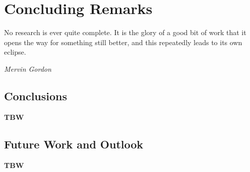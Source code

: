 \chapter{Concluding Remarks}
	\vspace{-2 cm}
	\epigraph{No research is ever quite complete. It is the glory of a good bit of work that it opens the way for something still better, and this repeatedly leads to its own eclipse.}{\textit{Mervin Gordon}}

\section{Conclusions}

\textbf{TBW}
        
\section{Future Work and Outlook}

\textbf{TBW}

